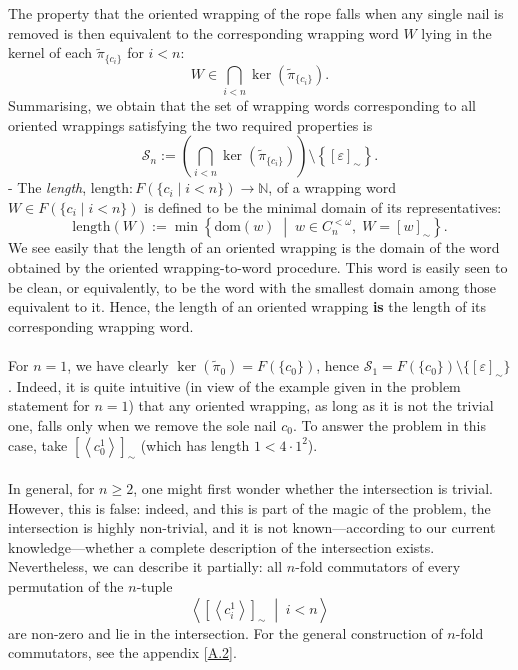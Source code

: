 \documentclass[11pt, a4paper, oneside]{article}
\theoremstyle{remark}
\theoremstyle{lemma}
\begin{document}
The property that the oriented wrapping of the rope falls when any single nail is removed is then equivalent to the corresponding wrapping word \(W\) lying in the kernel of each \(\tilde{\pi}_{\{c_i\}}\) for \(i<n\):
\[
W \in \bigcap_{i<n} \ker\!\left(\tilde{\pi}_{\{c_i\}}\right).
\]
Summarising, we obtain that the set of wrapping words corresponding to all oriented wrappings satisfying the two required properties is
\[
\mathcal{S}_n := \left( \bigcap_{i<n} \ker\!\left(\tilde{\pi}_{\{c_i\}}\right) \right) \setminus \left\{[\varepsilon]_{\sim}\right\}.
\]
- The \textit{length}, $\mathrm{length}:F\!\left(\{c_i \mid i<n\}\right)\rightarrow\mathbb{N}$, of a wrapping word $W \in F\!\left(\{c_i \mid i<n\}\right)$ is defined to be the minimal domain of its representatives:
\[
\mathrm{length}\!\left(W\right) := \min \left\{ \mathrm{dom}\!\left(w\right) \;\middle|\; w \in C_n^{<\omega}, \; W = [w]_{\sim} \right\}.
\]
We see easily that the length of an oriented wrapping is the domain of the word obtained by the oriented wrapping-to-word procedure. This word is easily seen to be clean, or equivalently, to be the word with the smallest domain among those equivalent to it. Hence, the length of an oriented wrapping \textbf{is} the length of its corresponding wrapping word.
\\\\
For \(n=1\), we have clearly \(\ker\left(\tilde{\pi}_0\right)=F(\{c_{0}\})\), hence \(\mathcal{S}_1 = F(\{c_{0}\})\setminus\{[\varepsilon]_{\sim}\}\).
Indeed, it is quite intuitive (in view of the example given in the problem statement for \(n=1\)) that any oriented wrapping, as long as it is not the trivial one, falls only when we remove the sole nail \(c_0\). To answer the problem in this case, take \(\left[ \left\langle c_0^1 \right\rangle \right]_{\sim}\) (which has length \(1< 4\cdot 1^2\)).
\\\\
In general, for \(n \geq 2\), one might first wonder whether the intersection is trivial. 
However, this is false: indeed, and this is part of the magic of the problem, the intersection is highly non-trivial, 
and it is not known—according to our current knowledge—whether a complete description of the intersection exists. 
Nevertheless, we can describe it partially: all \(n\)-fold commutators of every permutation of the \(n\)-tuple 
\[
\left\langle \left[ \left\langle c_i^1 \right\rangle \right]_{\sim} \;\middle|\; i<n \right\rangle
\] 
are non-zero and lie in the intersection. For the general construction of \(n\)-fold commutators, see the appendix [\hyperref[A2]{A.2}].
\end{document}
